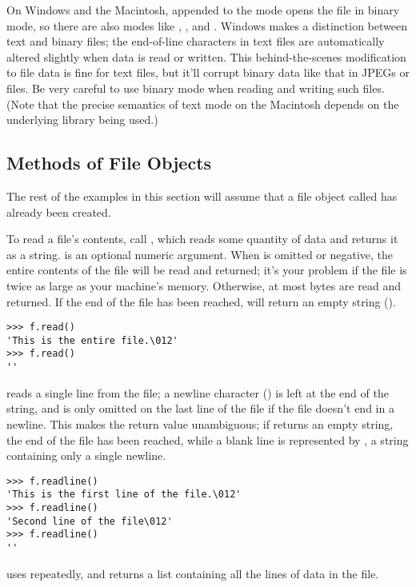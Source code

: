 \documentclass{manual}
\begin{document}
On Windows and the Macintosh,  appended to the
mode opens the file in binary mode, so there are also modes like
, , and .  Windows makes a
distinction between text and binary files; the end-of-line characters
in text files are automatically altered slightly when data is read or
written.  This behind-the-scenes modification to file data is fine for
\ASCII{} text files, but it'll corrupt binary data like that in JPEGs or
 files.  Be very careful to use binary mode when reading and
writing such files.  (Note that the precise semantics of text mode on
the Macintosh depends on the underlying \C{} library being used.)

\subsection{Methods of File Objects}
\label{fileMethods}

The rest of the examples in this section will assume that a file
object called  has already been created.

To read a file's contents, call , which reads
some quantity of data and returns it as a string.   is an
optional numeric argument.  When  is omitted or negative,
the entire contents of the file will be read and returned; it's your
problem if the file is twice as large as your machine's memory.
Otherwise, at most  bytes are read and returned.  If the end
of the file has been reached,  will return an empty
string ().
\begin{verbatim}
>>> f.read()
'This is the entire file.\012'
>>> f.read()
''
\end{verbatim}

 reads a single line from the file; a newline
character () is left at the end of the string, and is only
omitted on the last line of the file if the file doesn't end in a
newline.  This makes the return value unambiguous; if
 returns an empty string, the end of the file has
been reached, while a blank line is represented by , a
string containing only a single newline.  

\begin{verbatim}
>>> f.readline()
'This is the first line of the file.\012'
>>> f.readline()
'Second line of the file\012'
>>> f.readline()
''
\end{verbatim}

 uses  repeatedly, and returns
a list containing all the lines of data in the file.
\end{document}

